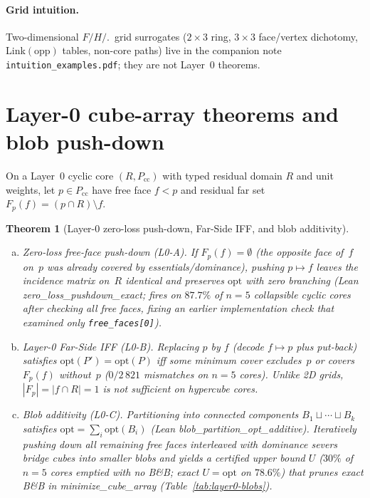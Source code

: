 \documentclass[11pt]{article}
\newtheorem{theorem}{Theorem}
\begin{document}
\paragraph{Grid intuition.}
Two-dimensional $F/H/.$\ grid surrogates ($2\times 3$ ring, $3\times 3$
face/vertex dichotomy, Link$(\mathrm{opp})$ tables, non-core paths) live in the
companion note \texttt{intuition\_examples.pdf}; they are not Layer~0 theorems.

\section{Layer-0 cube-array theorems and blob push-down}
\label{sec:layer0-main}

On a Layer~0 cyclic core $(R,P_{\mathrm{cc}})$ with typed residual domain $R$ and
unit weights, let $p\in P_{\mathrm{cc}}$ have free face $f<p$ and residual far set
$F_p(f)=(p\cap R)\setminus f$.

\begin{theorem}[Layer-0 zero-loss push-down, Far-Side IFF, and blob additivity]
\label{thm:layer0}
\begin{enumerate}[(a)]
\item \emph{Zero-loss free-face push-down (L0-A).}  If $F_p(f)=\emptyset$ (the
opposite face of~$f$ on~$p$ was already covered by essentials/dominance), pushing
$p\mapsto f$ leaves the incidence matrix on~$R$ identical and preserves
$\mathrm{opt}$ with \emph{zero branching} (Lean \textsf{zero\_loss\_pushdown\_exact};
fires on $87.7\%$ of $n=5$ collapsible cyclic cores after checking all free faces,
fixing an earlier implementation check that examined only \texttt{free\_faces[0]}).
\item \emph{Layer-0 Far-Side IFF (L0-B).}  Replacing $p$ by $f$ (decode $f\mapsto p$
plus put-back) satisfies $\mathrm{opt}(P')=\mathrm{opt}(P)$ iff some minimum cover
excludes~$p$ or covers $F_p(f)$ without~$p$ ($0/2\,821$ mismatches on $n=5$ cores).
Unlike 2D grids, $|F_p|=|f\cap R|=1$ is \emph{not} sufficient on hypercube cores.
\item \emph{Blob additivity (L0-C).}  Partitioning into connected components
$B_1\sqcup\cdots\sqcup B_k$ satisfies $\mathrm{opt}=\sum_i\mathrm{opt}(B_i)$
(Lean \textsf{blob\_partition\_opt\_additive}).  Iteratively pushing down all
remaining free faces interleaved with dominance severs bridge cubes into smaller
blobs and yields a certified upper bound $U$ ($30\%$ of $n=5$ cores emptied with
no B\&B; exact $U=\mathrm{opt}$ on $78.6\%$) that prunes exact B\&B in
\textsf{minimize\_cube\_array} (Table~\ref{tab:layer0-blobs}).
\end{enumerate}
\end{theorem}
\end{document}

